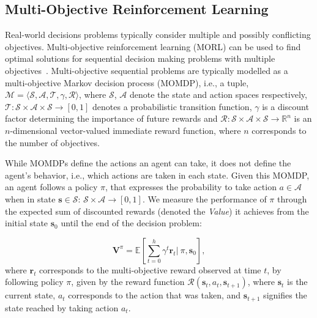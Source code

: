\documentclass{article}
\renewcommand{\cite}[1]{\citep{#1}}
\newcommand{\mdpstatespace}{\mathcal{S}}
\newcommand{\mdpactionspace}{\mathcal{A}}
\newcommand{\mdpdiscount}{\gamma}
\newcommand{\mdppolicy}{\pi}
\newcommand{\momdpvaluefunction}{\mathbf{V}}
\newcommand{\mdptransition}{\mathcal{T}}
\newcommand{\mdprewardfn}{\mathcal{R}}
\newcommand{\momdprewardfn}{\bm{\mathcal{R}}}
\newcommand{\mdpstate}{\mathbf{s}}
\newcommand{\momdpreward}{\mathbf{r}}
\newcommand{\action}{a}
\newcommand{\ltuple}{\langle}
\newcommand{\rtuple}{\rangle}
\begin{document}
\subsection{Multi-Objective Reinforcement Learning}
\label{sec:reinforcement-learning}
Real-world decisions problems typically consider multiple and possibly conflicting objectives. Multi-objective reinforcement learning (MORL) can be used to find optimal solutions for sequential decision making problems with multiple objectives~\cite{hayes2021practical}. Multi-objective sequential problems are typically modelled as a multi-objective Markov decision process (MOMDP), i.e., a tuple, $\mathcal{M} = \ltuple\mdpstatespace, \mdpactionspace, \mdptransition, \mdpdiscount, \momdprewardfn\rtuple$, where $\mdpstatespace$, $\mdpactionspace$ denote the state and action spaces respectively, $\mdptransition \colon \mdpstatespace \times \mdpactionspace \times \mdpstatespace  \to \left[ 0, 1 \right]$ denotes a probabilistic transition function, $\mdpdiscount$ is a discount factor determining the importance of future rewards and $\momdprewardfn \colon \mdpstatespace \times \mdpactionspace \times \mdpstatespace \to \mathbb{R}^n$ is an $n$-dimensional vector-valued immediate reward function, where $n$ corresponds to the number of objectives. 

While MOMDPs define the actions an agent can take, it does not define the agent's behavior, i.e., which actions are taken in each state. Given this MOMDP, an agent follows a policy $\mdppolicy$, that expresses the probability to take action $\action \in \mdpactionspace$ when in state $\mdpstate \in \mdpstatespace$: $\mdpstatespace \times \mdpactionspace \to \left[ 0, 1 \right]$. We measure the performance of $\mdppolicy$ through the expected sum of discounted rewards (denoted the \emph{Value}) it achieves from the initial state $\mdpstate_0$ until the end of the decision problem:

\begin{equation}
    \momdpvaluefunction^\mdppolicy = \mathbb{E} \left [ \sum_{t=0}^h \mdpdiscount^t \momdpreward_t |\ \mdppolicy, \mdpstate_0 \right ],
\end{equation}
%
where $\momdpreward_t$ corresponds to the multi-objective reward observed at time $t$, by following policy $\mdppolicy$, given by the reward function $\mdprewardfn(\mdpstate_t, \action_t, \mdpstate_{t+1})$, where $\mdpstate_t$ is the current state, $\action_t$ corresponds to the action that was taken, and $\mdpstate_{t+1}$ signifies the state reached by taking action $\action_t$.
\end{document}
